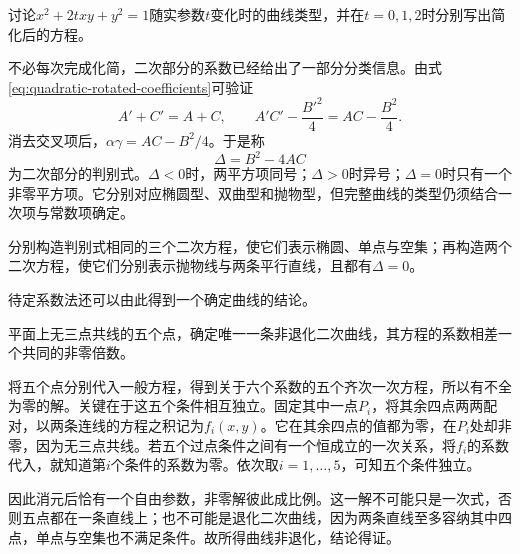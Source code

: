 \begin{example}
讨论\(x^2+2txy+y^2=1\)随实参数\(t\)变化时的曲线类型，并在\(t=0,1,2\)时分别写出简化后的方程。
\end{example}

不必每次完成化简，二次部分的系数已经给出了一部分分类信息。由式\eqref{eq:quadratic-rotated-coefficients}可验证
\begin{equation*}
    A'+C'=A+C , \qquad A'C'-\frac{B'^2}{4}=AC-\frac{B^2}{4} .
\end{equation*}
消去交叉项后，\(\alpha\gamma=AC-B^2/4\)。于是称
\begin{equation}\label{eq:quadratic-discriminant}
    \Delta=B^2-4AC
\end{equation}
为二次部分的{\heiti{}判别式}。\(\Delta<0\)时，两平方项同号；\(\Delta>0\)时异号；\(\Delta=0\)时只有一个非零平方项。它分别对应椭圆型、双曲型和抛物型，但完整曲线的类型仍须结合一次项与常数项确定。

\begin{example}
分别构造判别式相同的三个二次方程，使它们表示椭圆、单点与空集；再构造两个二次方程，使它们分别表示抛物线与两条平行直线，且都有\(\Delta=0\)。
\end{example}

待定系数法还可以由此得到一个确定曲线的结论。

\begin{proposition}\label{prop:quadratic-five-points}
平面上无三点共线的五个点，确定唯一一条非退化二次曲线，其方程的系数相差一个共同的非零倍数。
\end{proposition}

将五个点分别代入一般方程，得到关于六个系数的五个齐次一次方程，所以有不全为零的解。关键在于这五个条件相互独立。固定其中一点\(P_i\)，将其余四点两两配对，以两条连线的方程之积记为\(f_i(x,y)\)。它在其余四点的值都为零，在\(P_i\)处却非零，因为无三点共线。若五个过点条件之间有一个恒成立的一次关系，将\(f_i\)的系数代入，就知道第\(i\)个条件的系数为零。依次取\(i=1,\ldots,5\)，可知五个条件独立。

因此消元后恰有一个自由参数，非零解彼此成比例。这一解不可能只是一次式，否则五点都在一条直线上；也不可能是退化二次曲线，因为两条直线至多容纳其中四点，单点与空集也不满足条件。故所得曲线非退化，结论得证。



